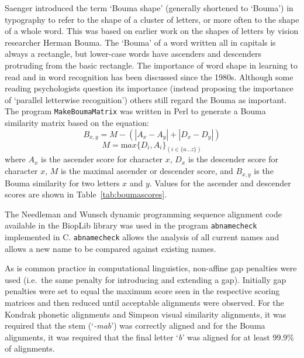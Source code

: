 \documentclass{article}
\newcommand{\eg}[1]{\mbox{`\emph{#1}'}}
\begin{document}
Saenger\cite{saenger:bouma} introduced the term `Bouma shape'
(generally shortened to `Bouma') in typography to refer to the shape
of a cluster of letters, or more often to the shape of a whole
word. This was based on earlier work on the shapes of letters by
vision researcher Herman Bouma\cite{bouma:isolated,bouma:initial}.
The `Bouma' of a word written all in capitals is always a rectangle,
but lower-case words have ascenders and descenders protruding from the
basic rectangle. The importance of word shape in learning to read and
in word recognition has been discussed since the 1980s\cite[for
  example]{haber:wordshape}. Although some reading psychologists
question its importance (instead proposing the importance of `parallel
letterwise
recognition'\cite{rayner:span,paap:wordshape,larson:wordrecognition})
others still regard the Bouma as important\cite{glezer:bouma}.  The
program \verb|MakeBoumaMatrix| was written in Perl to generate a Bouma
similarity matrix based on the equation:
\begin{equation}
  B_{x,y} = M - (|A_x - A_y| + |D_x - D_y|)
\end{equation}
\begin{equation}
  M={\mathrm max}\{D_i, A_i\}_{(i\in \{a\ldots z\})}
\end{equation}
where $A_x$ is the ascender score for character $x$, $D_x$ is the
descender score for character $x$, $M$ is the maximal ascender or
descender score, and $B_{x,y}$ is the Bouma similarity for two letters
$x$ and $y$. Values for the ascender and descender scores are shown in
Table~\ref{tab:boumascores}.

The Needleman and Wunsch dynamic programming sequence alignment code
available in the BiopLib\cite{porter:bioplib} library was used in the
program \verb|abnamecheck| implemented in C. \verb|abnamecheck| allows
the analysis of all current names and allows a new name to be compared
against existing names.

As is common practice in computational linguistics, non-affine gap
penalties were used (i.e.\ the same penalty for introducing and
extending a gap). Initially gap penalties were set to equal the
maximum score seen in the respective scoring matrices and then reduced
until acceptable alignments were observed. For the Kondrak phonetic
alignments and Simpson visual similarity alignments, it was required
that the stem (\eg{-mab}) was correctly aligned and for the Bouma
alignments, it was required that the final letter \eg{b} was aligned
for at least 99.9\% of alignments.
\end{document}
